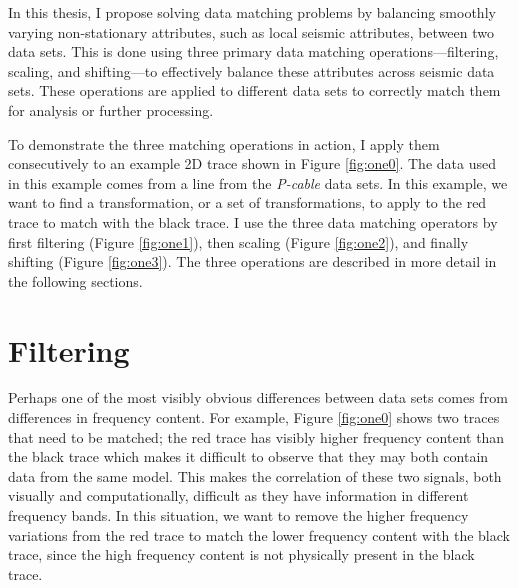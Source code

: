 In this thesis, I propose solving data matching problems by balancing smoothly varying non-stationary attributes, such as local seismic attributes, between two data sets.
This is done using three primary data matching operations---filtering, scaling, and shifting---to effectively balance these attributes across seismic data sets.
These operations are applied to different data sets to correctly match them for analysis or further processing.

To demonstrate the three matching operations in action, I apply them consecutively to an example 2D trace shown in Figure \ref{fig:one0}.
The data used in this example comes from a line from the {\em P-cable} data sets.
In this example, we want to find a transformation, or a set of transformations, to apply to the red trace to match with the black trace.
I use the three data matching operators by first filtering (Figure \ref{fig:one1}), then scaling (Figure \ref{fig:one2}), and finally shifting (Figure \ref{fig:one3}).
The three operations are described in more detail in the following sections.






\section{Filtering}
Perhaps one of the most visibly obvious differences between data sets comes from differences in frequency content.
For example, Figure \ref{fig:one0} shows two traces that need to be matched; the red trace has visibly higher frequency content than the black trace which makes it difficult to observe that they may both contain data from the same model.
This makes the correlation of these two signals, both visually and computationally, difficult as they have information in different frequency bands.
In this situation, we want to remove the higher frequency variations from the red trace to match the lower frequency content with the black trace, since the high frequency content is not physically present in the black trace.

